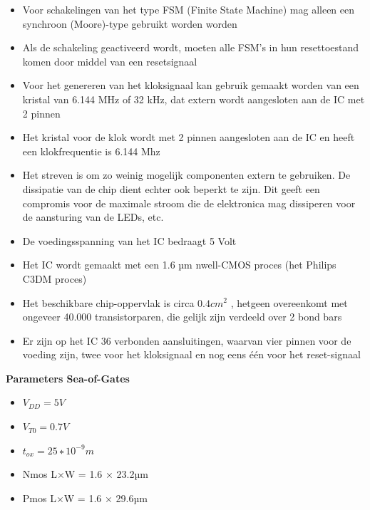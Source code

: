 \documentclass{scrartcl} %
\begin{document}
\begin{itemize}
\item Voor schakelingen van het type FSM (Finite State Machine) mag alleen een synchroon (Moore)-type gebruikt worden
worden
\item Als de schakeling geactiveerd wordt, moeten alle FSM’s in hun resettoestand komen door middel van een resetsignaal
\item Voor het genereren van het kloksignaal kan gebruik gemaakt worden van een kristal van 6.144 MHz of 32 kHz, dat extern wordt aangesloten aan de IC met 2 pinnen
\item Het kristal voor de klok wordt met 2 pinnen aangesloten aan de IC en heeft een klokfrequentie is 6.144 Mhz
\item Het streven is om zo weinig mogelijk componenten extern te gebruiken. De dissipatie van de chip dient echter ook beperkt te zijn. Dit geeft een compromis voor de maximale stroom
die de elektronica mag dissiperen voor de aansturing van de LEDs, etc.
\item De voedingsspanning van het IC bedraagt 5 Volt
\item Het IC wordt gemaakt met een 1.6 µm nwell-CMOS proces (het Philips C3DM proces)
\item Het beschikbare chip-oppervlak is circa $0.4  cm^2$ , hetgeen overeenkomt met ongeveer 40.000 transistorparen, die gelijk zijn verdeeld over 2 bond bars
\item Er zijn op het IC 36 verbonden aansluitingen, waarvan vier pinnen voor de voeding zijn, twee voor het kloksignaal en nog eens één voor het reset-signaal
\end {itemize}

\textbf{Parameters Sea-of-Gates}
\begin {itemize}
\item $V_{DD} = 5V$
\item$ V_{T0} = 0.7V$
\item  $t_{ox} = 25 ∗ 10^{−9}m$
\item Nmos L×W = 1.6 × 23.2µm
\item Pmos L×W = 1.6 × 29.6µm
\end {itemize}
\end{document}
